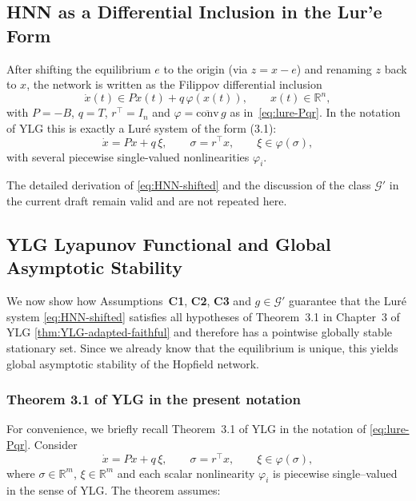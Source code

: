 \documentclass[journal]{IEEEtran}
\begin{document}
\subsection{HNN as a Differential Inclusion in the Lur'e Form}

After shifting the equilibrium $e$ to the origin (via $z=x-e$) and
renaming $z$ back to $x$, the network is written as the Filippov
differential inclusion
\begin{equation}\label{eq:HNN-shifted}
      \dot x(t)\in P x(t)+q\,\varphi(x(t)), \qquad x(t)\in\mathbb R^n,
\end{equation}
with $P=-B$, $q=T$, $r^{\top}=I_n$ and $\varphi=\overline{\mathrm{conv}}\,g$ as
in~\eqref{eq:lure-Pqr}.  In the notation of YLG this is exactly a
Lur\'e system of the form (3.1):
\[
  \dot x = P x + q\,\xi,\qquad
  \sigma = r^{\top} x,\qquad
  \xi \in \varphi(\sigma),
\]
with several piecewise single-valued nonlinearities $\varphi_i$.

The detailed derivation of \eqref{eq:HNN-shifted} and the discussion
of the class $\mathcal G'$ in the current draft remain valid and are
not repeated here.

\subsection{YLG Lyapunov Functional and Global Asymptotic Stability}
\label{subsec:YLG-main}

We now show how Assumptions~\textbf{C1}, \textbf{C2},
\textbf{C3} and $g\in\mathcal G'$ guarantee that the Lur\'e system
\eqref{eq:HNN-shifted} satisfies all hypotheses of Theorem~3.1 in
Chapter~3 of YLG \ref{thm:YLG-adapted-faithful} and therefore has a pointwise globally stable
stationary set.  Since we already know that the equilibrium is unique,
this yields global asymptotic stability of the Hopfield network.

\subsubsection*{Theorem 3.1 of YLG in the present notation}

For convenience, we briefly recall Theorem~3.1 of YLG in the notation
of \eqref{eq:lure-Pqr}.  Consider
\[
  \dot x = P x + q\,\xi,\qquad
  \sigma = r^{\top} x,\qquad
  \xi \in \varphi(\sigma),
\]
where $\sigma\in\mathbb{R}^m$, $\xi\in\mathbb{R}^m$ and each scalar
nonlinearity $\varphi_i$ is piecewise single–valued in the sense of
YLG.  The theorem assumes:
\end{document}

